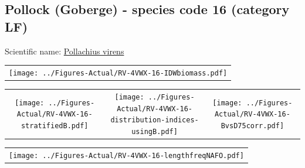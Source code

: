 \documentclass[12pt]{article}\usepackage[]{graphicx}\usepackage[]{color}
\begin{document}
\renewcommand\thefigure{\thesubsection\Alph{figure}}

\setcounter{figure}{0}

\hypertarget{sec:16}{%
\subsection{Pollock (Goberge) - species code 16 (category LF)}\label{sec:16}}

  


Scientific name: \href{http://www.marinespecies.org/aphia.php?p=taxdetails\&id=126441}{Pollachius virens} \newline
\begin{minipage}{1.0\textwidth}
 \begin{tabular}{c}
\texttt{[image: ../Figures-Actual/RV-4VWX-16-IDWbiomass.pdf]} \\ 
\end{tabular} 
\end{minipage}
\newline

\vspace{1cm}
\begin{minipage}{1.0\textwidth}
 \begin{tabular}{ccc}
\texttt{[image: ../Figures-Actual/RV-4VWX-16-stratifiedB.pdf]} & 
\texttt{[image: ../Figures-Actual/RV-4VWX-16-distribution-indices-usingB.pdf]} & 
\texttt{[image: ../Figures-Actual/RV-4VWX-16-BvsD75corr.pdf]} \\ 
\end{tabular} 
\end{minipage}
\clearpage
\begin{minipage}{1.0\textwidth}
 \begin{tabular}{c}
\texttt{[image: ../Figures-Actual/RV-4VWX-16-lengthfreqNAFO.pdf]} \\ 
\end{tabular} 
\end{minipage}
\newline
\end{document}
